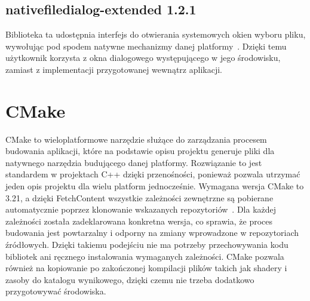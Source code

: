 \subsection{nativefiledialog-extended 1.2.1}
\label{filedialog}
Biblioteka ta udostępnia interfejs do otwierania systemowych okien wyboru pliku, wywołując pod spodem natywne mechanizmy danej platformy~\cite{nativefiledialogRepo}. Dzięki temu użytkownik korzysta z okna dialogowego występującego w jego środowisku, zamiast z implementacji przygotowanej wewnątrz aplikacji.

\section{CMake}
\label{cmake}
CMake to wieloplatformowe narzędzie służące do zarządzania procesem budowania aplikacji, które na podstawie opisu projektu generuje pliki dla natywnego narzędzia budującego danej platformy. Rozwiązanie to jest standardem w projektach C++ dzięki przenośności, ponieważ pozwala utrzymać jeden opis projektu dla wielu platform jednocześnie. Wymagana wersja CMake to 3.21, a dzięki FetchContent wszystkie zależności zewnętrzne są pobierane automatycznie poprzez klonowanie wskazanych repozytoriów~\cite{cmake320fetchcontent}. Dla każdej zależności została zadeklarowana konkretna wersja, co sprawia, że proces budowania jest powtarzalny i odporny na zmiany wprowadzone w repozytoriach źródłowych. Dzięki takiemu podejściu nie ma potrzeby przechowywania kodu bibliotek ani ręcznego instalowania wymaganych zależności. CMake pozwala również na kopiowanie po zakończonej kompilacji plików takich jak shadery i zasoby do katalogu wynikowego, dzięki czemu nie trzeba dodatkowo przygotowywać środowiska.